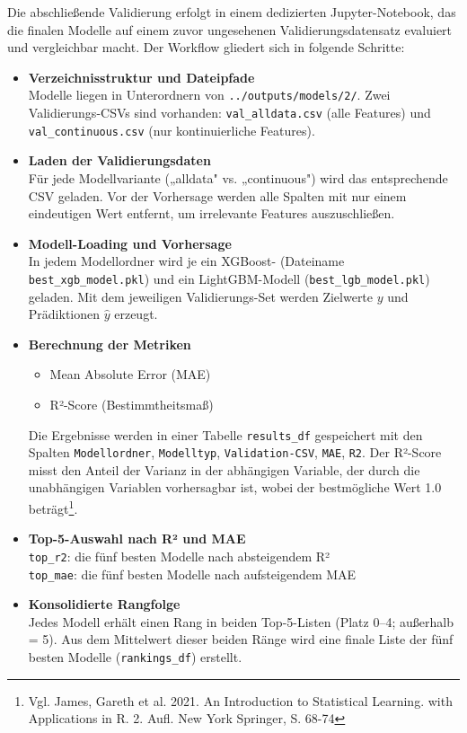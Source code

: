 Die abschließende Validierung erfolgt in einem dedizierten Jupyter-Notebook, das die finalen Modelle auf einem zuvor ungesehenen Validierungsdatensatz evaluiert und vergleichbar macht. Der Workflow gliedert sich in folgende Schritte:

\begin{itemize}
  \item \textbf{Verzeichnisstruktur und Dateipfade}\\
  Modelle liegen in Unterordnern von \texttt{../outputs/models/2/}. Zwei Validierungs-CSVs sind vorhanden: \texttt{val\_alldata.csv} (alle Features) und \texttt{val\_continuous.csv} (nur kontinuierliche Features).
  
  \item \textbf{Laden der Validierungsdaten}\\
  Für jede Modellvariante („alldata" vs. „continuous") wird das entsprechende CSV geladen. Vor der Vorhersage werden alle Spalten mit nur einem eindeutigen Wert entfernt, um irrelevante Features auszuschließen.
  
  \item \textbf{Modell-Loading und Vorhersage}\\
  In jedem Modellordner wird je ein XGBoost- (Dateiname \texttt{best\_xgb\_model.pkl}) und ein LightGBM-Modell (\texttt{best\_lgb\_model.pkl}) geladen. Mit dem jeweiligen Validierungs-Set werden Zielwerte \(y\) und Prädiktionen \(\hat{y}\) erzeugt.
  
  \item \textbf{Berechnung der Metriken}\\
  \begin{itemize}
    \item Mean Absolute Error (MAE)
    \item R²-Score (Bestimmtheitsmaß)
  \end{itemize}
  Die Ergebnisse werden in einer Tabelle \texttt{results\_df} gespeichert mit den Spalten \texttt{Modellordner}, \texttt{Modelltyp}, \texttt{Validation-CSV}, \texttt{MAE}, \texttt{R2}. Der R²-Score misst den Anteil der Varianz in der abhängigen Variable, der durch die unabhängigen Variablen vorhersagbar ist, wobei der bestmögliche Wert 1.0 beträgt\footnote{Vgl. James, Gareth et al. 2021. An Introduction to Statistical Learning. with Applications in R. 2. Aufl. New York Springer, S. 68-74}.
  
  \item \textbf{Top-5-Auswahl nach R² und MAE}\\
  \texttt{top\_r2}: die fünf besten Modelle nach absteigendem R²\\
  \texttt{top\_mae}: die fünf besten Modelle nach aufsteigendem MAE
  
  \item \textbf{Konsolidierte Rangfolge}\\
  Jedes Modell erhält einen Rang in beiden Top-5-Listen (Platz 0–4; außerhalb = 5). Aus dem Mittelwert dieser beiden Ränge wird eine finale Liste der fünf besten Modelle (\texttt{rankings\_df}) erstellt.
\end{itemize}

